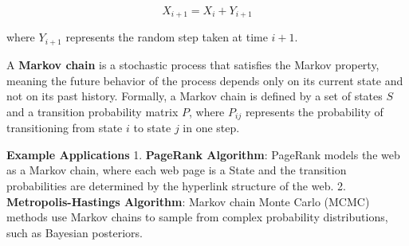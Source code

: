 \documentclass[12pt]{book} %
\begin{document}
\[ X_{i+1} = X_i + Y_{i+1} \]

where \(Y_{i+1}\) represents the random step taken at time \(i+1\).

A \textbf{Markov chain} is a stochastic process that satisfies the Markov property, meaning the future behavior of the process depends only on its current state and not on its past history. Formally, a Markov chain is defined by a set of states \(S\) and a transition probability matrix \(P\), where \(P_{ij}\) represents the probability of transitioning from state \(i\) to state \(j\) in one step.


\textbf{Example Applications}
1. \textbf{PageRank Algorithm}: PageRank models the web as a Markov chain, where each web page is a State and the transition probabilities are determined by the hyperlink structure of the web.
2. \textbf{Metropolis-Hastings Algorithm}: Markov chain Monte Carlo (MCMC) methods use Markov chains to sample from complex probability distributions, such as Bayesian posteriors.
\end{document}
